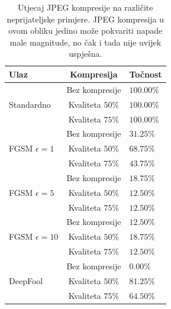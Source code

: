 \documentclass[utf8, diplomski]{fer}
\begin{document}
\begin{table}[H]
\centering
\begin{tabular}{@{}lcl@{}}
\toprule
Ulaz & Kompresija & Točnost \\ \midrule
\multirow{3}{*}{Standardno} & Bez kompresije & $100.00\%$ \\
							& Kvaliteta $50\%$ & $100.00\%$ \\
							& Kvaliteta $75\%$ & $100.00\%$ \\ \midrule
							
\multirow{3}{*}{FGSM $\epsilon = 1$} & Bez kompresije & $31.25\%$ \\
									 & Kvaliteta $50\%$ & $68.75\%$ \\
									 & Kvaliteta $75\%$ & $43.75\%$ \\ \midrule

\multirow{3}{*}{FGSM $\epsilon = 5$} & Bez kompresije & $18.75\%$ \\
									 & Kvaliteta $50\%$ & $12.50\%$ \\
									 & Kvaliteta $75\%$ & $12.50\%$ \\\midrule
									 
\multirow{3}{*}{FGSM $\epsilon = 10$} & Bez kompresije & $12.50\%$ \\
									 & Kvaliteta $50\%$ & $18.75\%$ \\
									 & Kvaliteta $75\%$ & $12.50\%$ \\\midrule
			
\multirow{3}{*}{DeepFool} & Bez kompresije & $0.00\%$ \\
						  & Kvaliteta $50\%$ & $81.25\%$ \\
						  & Kvaliteta $75\%$ & $64.50\%$ \\ \bottomrule

\end{tabular}
\caption{Utjecaj JPEG kompresije na različite neprijateljske primjere. JPEG kompresija u ovom obliku jedino može pokvariti napade male magnitude, no čak i tada nije uvijek uspješna.}\label{jpeg_defense_table}
\end{table}
\end{document}

